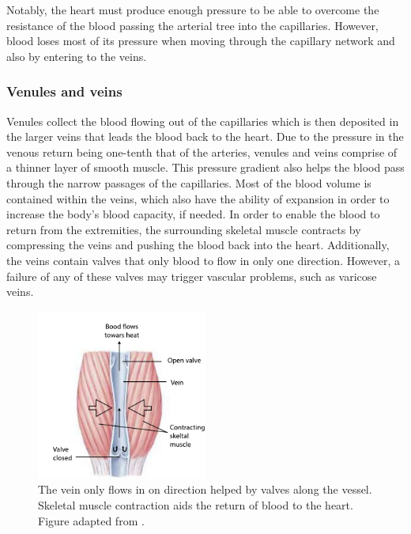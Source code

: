 Notably, the heart must produce enough pressure to be able to overcome the resistance of the blood passing the arterial tree into the capillaries. However, blood loses most of its pressure when moving through the capillary network and also by entering to the veins. 

\subsubsection{Venules and veins}
Venules collect the blood flowing out of the capillaries which is then deposited in the larger veins that leads the blood back to the heart. Due to the pressure in the venous return being one-tenth that of the arteries, venules and veins comprise of a thinner layer of smooth muscle. This pressure gradient also helps the blood pass through the narrow passages of the capillaries. Most of the blood volume is contained within the veins, which also have the ability of expansion in order to increase the body's blood capacity, if needed. In order to enable the blood to return from the extremities, the surrounding skeletal muscle contracts by compressing the veins and pushing the blood back into the heart\cite{Hall:2015aa, scanlon2014essentials}. Additionally, the veins contain valves that only blood to flow in only one direction. However, a failure of any of these valves may trigger vascular problems, such as varicose veins. 

\begin{figure}[!htpb]
	\centering
	\includegraphics[width=0.5\textwidth,keepaspectratio]{figure2}    
	\caption[Venous return through skeletal muscle]{The vein only flows in on direction helped by valves along the vessel. Skeletal muscle contraction aids the return of blood to the heart. Figure adapted from \cite{johnson2001biology}. }
	\label{fig:venous return}
\end{figure}

